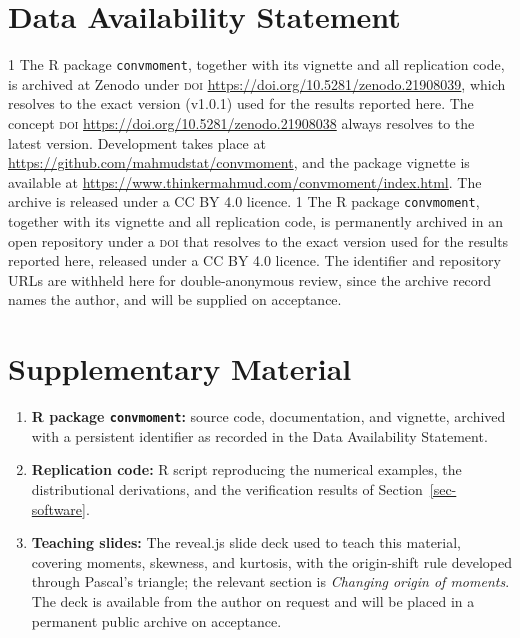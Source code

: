 \documentclass[
  12pt]{article}
\newcommand{\anon}{1}
\begin{document}
\section{Data Availability Statement}

\anon
The R package \texttt{convmoment}, together with its vignette and all replication code, is archived at Zenodo under \textsc{doi} \url{https://doi.org/10.5281/zenodo.21908039}, which resolves to the exact version (v1.0.1) used for the results reported here. The concept \textsc{doi} \url{https://doi.org/10.5281/zenodo.21908038} always resolves to the latest version. Development takes place at \url{https://github.com/mahmudstat/convmoment}, and the package vignette is available at \url{https://www.thinkermahmud.com/convmoment/index.html}. The archive is released under a CC BY 4.0 licence.
\fi
{}\anon
The R package \texttt{convmoment}, together with its vignette and all replication code, is permanently archived in an open repository under a \textsc{doi} that resolves to the exact version used for the results reported here, released under a CC BY 4.0 licence. The identifier and repository URLs are withheld here for double-anonymous review, since the archive record names the author, and will be supplied on acceptance.
\fi

\section{Supplementary Material}\label{sec-supp}

\begin{enumerate}
\item \textbf{R package \texttt{convmoment}:} source code, documentation, and vignette, archived with a persistent identifier as recorded in the Data Availability Statement.
\item \textbf{Replication code:} R script reproducing the numerical examples, the distributional derivations, and the verification results of Section~\ref{sec-software}.
\item \textbf{Teaching slides:} The reveal.js slide deck used to teach this material, covering moments, skewness, and kurtosis, with the origin-shift rule developed through Pascal's triangle; the relevant section is \emph{Changing origin of moments}. The deck is available from the author on request and will be placed in a permanent public archive on acceptance.
\end{enumerate}


\end{document}
